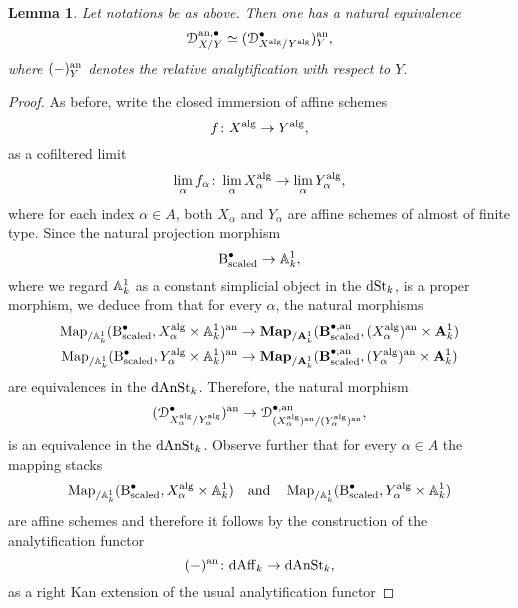 \documentclass[10pt,a4paper,reqno]{amsart} %
\theoremstyle{plain}
\newtheorem{lem}[thm]{Lemma}
\theoremstyle{definition}
\theoremstyle{remark}
\numberwithin{equation}{section}
\begin{document}
\begin{lem} \label{lem:analytification_of_simplicial_object_deformation}
    Let notations be as above. Then one has a natural equivalence
        \[
            \mathcal D_{X/Y}^{\mathrm{an}, \bullet} \simeq (\mathcal D_{X^\mathrm{alg}/ Y^\mathrm{alg}}^\bullet)^\mathrm{an}_Y  ,
        \]
    where $(-)_Y^\mathrm{an}$ denotes the relative analytification with respect to $Y$.
\end{lem}

\begin{proof}
    As before, write the closed immersion of affine schemes
        \[
            f \colon X^\mathrm{alg} \to Y^\mathrm{alg},  
        \]
    as a cofiltered limit 
        \[\lim_\alpha f_\alpha \colon \lim_\alpha X_\alpha^\mathrm{alg} \to \lim_\alpha Y_\alpha^\mathrm{alg},\]
    where for each index $\alpha \in A$, both $X_\alpha$
    and $Y_\alpha$ are affine schemes of almost of finite type. Since the natural projection morphism
        \[
            \mathrm{B}_\mathrm{scaled}^\bullet \to \mathbb A^1_k, 
        \]
    where we regard $\mathbb A^1_k$ as a constant simplicial object in the \infcat $\mathrm{dSt}_k$, is a proper morphism, we deduce from \cite[Theorem 6.13]{Holstein_Analytification_of_mapping_stacks}
    that for every $\alpha$, the natural morphisms
        \begin{align*}
            \operatorname{Map}_{/\mathbb A^1_k}(\mathrm{B}^\bullet_\mathrm{scaled}, X_\alpha^\mathrm{alg} \times \mathbb A^1_k)^\mathrm{an} & \to \mathbf{Map}_{/ \mathbf A^1_k}(\mathbf{B}^{\bullet, \mathrm{an}}_\mathrm{scaled} , (X_\alpha^\mathrm{alg})^\mathrm{an} \times \mathbf A^1_k) \\
            \operatorname{Map}_{/\mathbb A^1_k}(\mathrm{B}^\bullet_\mathrm{scaled}, Y_\alpha^\mathrm{alg} \times \mathbb A^1_k)^\mathrm{an} & \to \mathbf{Map}_{/ \mathbf A^1_k}(\mathbf{B}^{\bullet, \mathrm{an}}_\mathrm{scaled} , (Y_\alpha^\mathrm{alg})^\mathrm{an} \times \mathbf A^1_k)
        \end{align*}
    are equivalences in the \infcat $\mathrm{dAnSt}_k$. Therefore, the natural morphism
        \[
            (\mathcal D_{X^\mathrm{alg}_\alpha/Y^\mathrm{alg}_\alpha}^\bullet )^\mathrm{an}  \to \mathcal D_{(X_\alpha ^\mathrm{alg})^\mathrm{an}/ (Y_\alpha ^\mathrm{alg})^\mathrm{an}}^{\bullet, \mathrm{an}},
        \]
    is an equivalence in the \infcat $\mathrm{dAnSt}_k$. Observe further that for every $\alpha \in A$ the mapping stacks
        \[
            \operatorname{Map}_{/ \mathbb A^1_k}(\mathrm{B}^\bullet_\mathrm{scaled}, X_\alpha^\mathrm{alg} \times \mathbb A^1_k) \quad \mathrm{and} \quad \operatorname{Map}_{/ \mathbb A^1_k}(\mathrm{B}^\bullet_\mathrm{scaled}, Y_\alpha^\mathrm{alg} \times \mathbb A^1_k)  
        \]
    are affine schemes and therefore it follows by the construction of the analytification functor
        \[
            (-)^\mathrm{an} \colon \mathrm{dAff}_k \to \mathrm{dAnSt}_k,  
        \]
    as a right Kan extension of the usual analytification functor

\end{proof}
\end{document}
